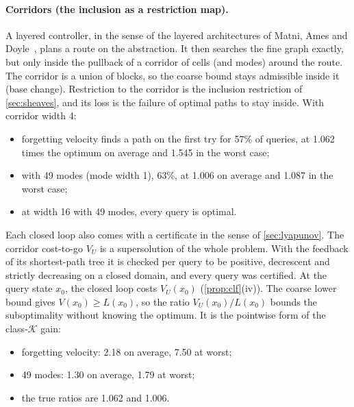 \documentclass[11pt]{article}
\theoremstyle{definition}
\theoremstyle{remark}
\begin{document}
\paragraph{Corridors (the inclusion as a restriction map).}
A layered controller, in the sense of the layered architectures of Matni, Ames and
Doyle~\cite{matni2024}, plans a route on the abstraction. It then searches the
fine graph exactly, but only inside the pullback of a corridor of cells (and
modes) around the route. The corridor is a union of blocks, so the coarse bound stays
admissible inside it (base change). Restriction to the corridor is the inclusion
restriction of \cref{sec:sheaves}, and its loss is the failure of optimal paths to
stay inside. With corridor width 4:
\begin{itemize}[nosep]
\item forgetting velocity finds a path on the first try for 57\% of queries, at
  1.062 times the optimum on average and 1.545 in the worst case;
\item with 49 modes (mode width 1), 63\%, at 1.006 on average and 1.087 in the
  worst case;
\item at width 16 with 49 modes, every query is optimal.
\end{itemize}

Each closed loop also comes with a certificate in the sense of
\cref{sec:lyapunov}. The corridor cost-to-go $V_U$ is a supersolution of the
whole problem. With the feedback of its shortest-path tree it is checked per
query to be positive, decrescent and strictly decreasing on a closed domain, and
every query was certified. At the query state $x_0$, the closed loop costs
$V_U(x_0)$ (\cref{prop:clf}(iv)). The coarse lower bound gives $V(x_0) \ge
L(x_0)$, so the ratio $V_U(x_0)/L(x_0)$ bounds the suboptimality without knowing
the optimum. It is the pointwise form of the class-$\mathcal K$ gain:
\begin{itemize}[nosep]
\item forgetting velocity: 2.18 on average, 7.50 at worst;
\item 49 modes: 1.30 on average, 1.79 at worst;
\item the true ratios are 1.062 and 1.006.
\end{itemize}
\end{document}
